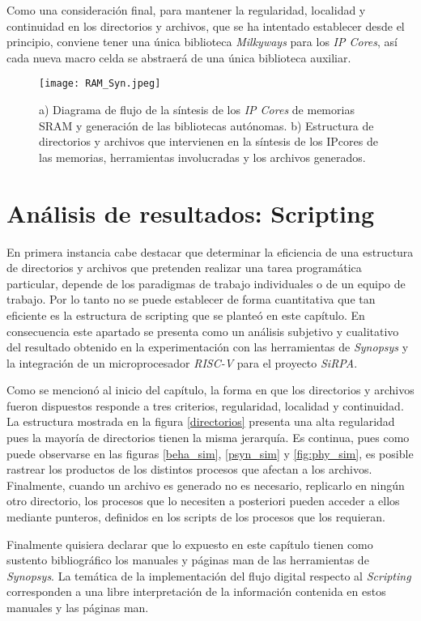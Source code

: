 Como una consideración final, para mantener la regularidad, localidad y continuidad en los directorios y archivos, que se ha intentado establecer desde el principio, conviene tener una única biblioteca \textit{Milkyways} para los \textit{IP Cores}, así cada nueva macro celda se abstraerá de una única biblioteca auxiliar.

\begin{figure}[ht]
\texttt{[image: RAM\_Syn.jpeg]}
\centering
\caption{a) Diagrama de flujo de la síntesis de los \textit{IP Cores} de memorias SRAM y generación de las bibliotecas autónomas. \newline b) Estructura de directorios y archivos que intervienen en la síntesis de los IPcores de las memorias, herramientas involucradas y los archivos generados.}
\end{figure}

\newpage

\section{Análisis de resultados: Scripting }

En primera instancia cabe destacar que determinar la eficiencia de una estructura de directorios y archivos que pretenden realizar una tarea programática particular, depende de los paradigmas de trabajo individuales o de un equipo de trabajo. Por lo tanto no se puede establecer de forma cuantitativa que tan eficiente es la estructura de scripting que se planteó en este capítulo. En consecuencia este apartado se presenta como un análisis subjetivo y cualitativo del resultado obtenido en la experimentación con las herramientas de \textit{Synopsys} y la integración de un microprocesador \textit{RISC-V} para el proyecto \textit{SiRPA}.

Como se mencionó al inicio del capítulo, la forma en que los directorios y archivos fueron dispuestos responde a tres criterios, regularidad, localidad y continuidad. La estructura mostrada en la figura \ref{directorios} presenta una alta regularidad pues la mayoría de directorios tienen la misma jerarquía. Es continua, pues como puede observarse en las figuras \ref{beha_sim}, \ref{psyn_sim} y \ref{fig:phy_sim}, es posible rastrear los productos de los distintos procesos que afectan a los archivos. Finalmente, cuando un archivo es generado no es necesario, replicarlo en ningún otro directorio, los procesos que lo necesiten a posteriori pueden acceder a ellos mediante punteros, definidos en los scripts de los procesos que los requieran.

Finalmente quisiera declarar que lo expuesto en este capítulo tienen como sustento bibliográfico los manuales y páginas man de las herramientas de \textit{Synopsys}. La temática de la implementación del flujo digital respecto al \textit{Scripting} corresponden a una libre interpretación de la información contenida en estos manuales y las páginas man.








